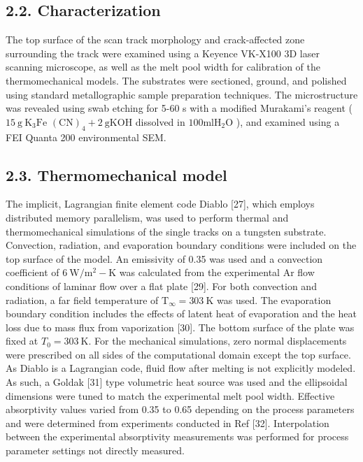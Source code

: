 \documentclass[10pt]{article}
\begin{document}
\subsection*{2.2. Characterization}
The top surface of the scan track morphology and crack-affected zone surrounding the track were examined using a Keyence VK-X100 3D laser scanning microscope, as well as the melt pool width for calibration of the thermomechanical models. The substrates were sectioned, ground, and polished using standard metallographic sample preparation techniques. The microstructure was revealed using swab etching for 5-60 s with a modified Murakami's reagent ( $15 \mathrm{~g} \mathrm{~K}_{3} \mathrm{Fe}$ $(\mathrm{CN})_{4}+2 \mathrm{~g} \mathrm{KOH}$ dissolved in $100 \mathrm{ml} \mathrm{H}_{2} \mathrm{O}$ ), and examined using a FEI Quanta 200 environmental SEM.

\subsection*{2.3. Thermomechanical model}
The implicit, Lagrangian finite element code Diablo [27], which employs distributed memory parallelism, was used to perform thermal and thermomechanical simulations of the single tracks on a tungsten substrate. Convection, radiation, and evaporation boundary conditions were included on the top surface of the model. An emissivity of 0.35 was used and a convection coefficient of $6 \mathrm{~W} / \mathrm{m}^{2}-\mathrm{K}$ was calculated from the experimental Ar flow conditions of laminar flow over a flat plate [29]. For both convection and radiation, a far field temperature of $\mathrm{T}_{\infty}=303 \mathrm{~K}$ was used. The evaporation boundary condition includes the effects of latent heat of evaporation and the heat loss due to mass flux from vaporization [30]. The bottom surface of the plate was fixed at $T_{0}=303 \mathrm{~K}$. For the mechanical simulations, zero normal displacements were prescribed on all sides of the computational domain except the top surface. As Diablo is a Lagrangian code, fluid flow after melting is not explicitly modeled. As such, a Goldak [31] type volumetric heat source was used and the ellipsoidal dimensions were tuned to match the experimental melt pool width. Effective absorptivity values varied from 0.35 to 0.65 depending on the process parameters and were determined from experiments conducted in Ref [32]. Interpolation between the experimental absorptivity measurements was performed for process parameter settings not directly measured.
\end{document}
